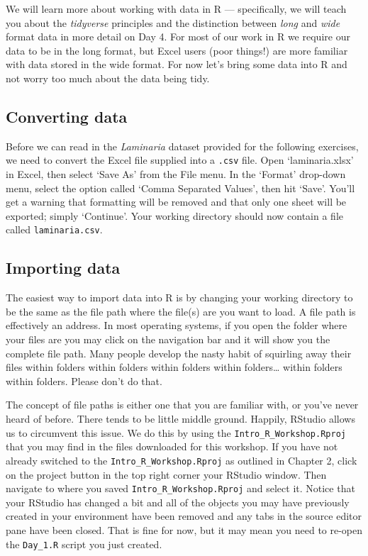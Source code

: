 \documentclass[
]{book}
\begin{document}
We will learn more about working with data in R --- specifically, we will teach you about the \emph{tidyverse} principles and the distinction between \emph{long} and \emph{wide} format data in more detail on Day 4. For most of our work in R we require our data to be in the long format, but Excel users (poor things!) are more familiar with data stored in the wide format. For now let's bring some data into R and not worry too much about the data being tidy.

\hypertarget{converting-data}{%
\subsection{Converting data}\label{converting-data}}

Before we can read in the \emph{Laminaria} dataset provided for the following exercises, we need to convert the Excel file supplied into a \texttt{.csv} file. Open `laminaria.xlsx' in Excel, then select `Save As' from the File menu. In the `Format' drop-down menu, select the option called `Comma Separated Values', then hit `Save'. You'll get a warning that formatting will be removed and that only one sheet will be exported; simply `Continue'. Your working directory should now contain a file called \texttt{laminaria.csv}.

\hypertarget{importing-data}{%
\subsection{Importing data}\label{importing-data}}

The easiest way to import data into R is by changing your working directory to be the same as the file path where the file(s) are you want to load. A file path is effectively an address. In most operating systems, if you open the folder where your files are you may click on the navigation bar and it will show you the complete file path. Many people develop the nasty habit of squirling away their files within folders within folders within folders within folders\ldots{} within folders within folders. Please don't do that.

The concept of file paths is either one that you are familiar with, or you've never heard of before. There tends to be little middle ground. Happily, RStudio allows us to circumvent this issue. We do this by using the \texttt{Intro\_R\_Workshop.Rproj} that you may find in the files downloaded for this workshop. If you have not already switched to the \texttt{Intro\_R\_Workshop.Rproj} as outlined in Chapter 2, click on the project button in the top right corner your RStudio window. Then navigate to where you saved \texttt{Intro\_R\_Workshop.Rproj} and select it. Notice that your RStudio has changed a bit and all of the objects you may have previously created in your environment have been removed and any tabs in the source editor pane have been closed. That is fine for now, but it may mean you need to re-open the \texttt{Day\_1.R} script you just created.
\end{document}
